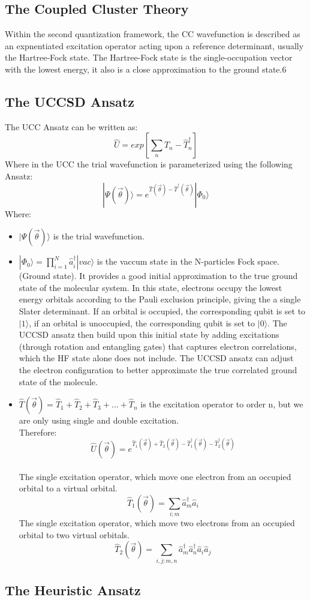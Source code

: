 \documentclass{article}
\begin{document}
\subsection*{The Coupled Cluster Theory}
Within the second quantization framework, the CC wavefunction is described as an expnentiated excitation operator acting upon a reference determinant, usually the Hartree-Fock state.
The Hartree-Fock state is the single-occupation vector with the lowest energy, it also is a close approximation to the ground state.6
\subsection*{The UCCSD Ansatz}
The UCC Ansatz can be written as:
\[\hat{U} = exp \left[\sum_{n}^{}\hat{T}_n - \hat{T}^\dagger_n\right]\] 
Where in the UCC the trial wavefunction is parameterized using the following Ansatz:
\[|\Psi(\vec{\theta}) \rangle = e^{\hat{T}(\vec{\theta}) - \hat{T}^\dagger (\vec{\theta})} |\Phi_0\rangle\]
Where:
\begin {itemize}
    \item  \(|\Psi(\vec{\theta}) \rangle\) is the trial wavefunction.
    \item \(|\Phi_0 \rangle = \prod_{i=1}^{N} \hat{a}^\dagger_i |vac\rangle\) is the vaccum state in the N-particles Fock space. (Ground state). It provides a good initial approximation to the true ground state of the molecular system. In this state, electrons occupy the lowest energy orbitals according
    to the Pauli exclusion principle, giving the a single Slater determinant. If an orbital is occupied, the corresponding qubit is set to \(|1\rangle\), if an orbital is unoccupied, the corresponding qubit is set to \( |0\rangle \).  The UCCSD ansatz then 
    build upon this initial state by adding excitations (through rotation and entangling gates) that captures electron correlations, which the HF state alone does not include. The UCCSD ansatz can adjust the electron configuration to better approximate the true correlated ground state of the molecule. 
    \item \(\hat{T}(\vec{\theta}) = \hat{T}_1 + \hat{T}_2 + \hat{T}_3 + \dots + \hat{T}_n\) is the excitation operator to order n, but we are only using single and double excitation.\\
    Therefore: 
    \[\hat{U}(\vec{\theta}) = e^{\hat{T}_1 (\vec{\theta})+ \hat{T}_2 (\vec{\theta}) - \hat{T}^\dagger_1 (\vec{\theta}) - \hat{T}^\dagger_2 (\vec{\theta})}\]
    \\
    The single excitation operator, which move one electron from an occupied orbital to a virtual orbital.
    \[\hat{T}_1(\vec{\theta}) = \sum_{i;m}^{}\hat{a}^\dagger_m \hat{a}_i\]
    The single excitation operator, which move two electrons from an occupied orbital to two virtual orbitals.
    \[\hat{T}_2(\vec{\theta}) = \sum_{i,j;m,n}^{}\hat{a}^\dagger_m \hat{a}^\dagger_n \hat{a}_i \hat{a}_j\]
    
\end{itemize}



\subsection*{The Heuristic Ansatz}
\end{document}

